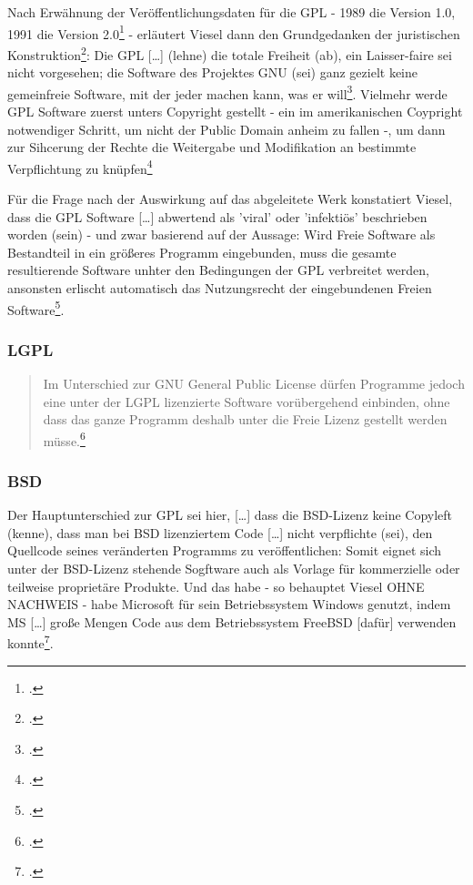 \documentclass[DIV=calc,BCOR=5mm,11pt,headings=small,oneside,abstract=true, toc=bib]{scrartcl}
\begin{document}
Nach Erwähnung der Veröffentlichungsdaten für die GPL - 1989 die Version
1.0, 1991 die Version 2.0\footcite[vgl.][61]{Viesel2006a} - erläutert Viesel
dann den Grundgedanken der juristischen
Konstruktion\footcite[vgl.][62ff]{Viesel2006a}: Die GPL \glqq{}[\ldots]
(lehne) die totale Freiheit (ab)\grqq{}, ein \glqq{}Laisser-faire\grqq{} sei
nicht vorgesehen; \glqq{}die Software des Projektes GNU (sei) ganz
gezielt keine gemeinfreie Software, mit der jeder machen kann, was er
will\grqq{}\footcite[vgl.][63]{Viesel2006a}. Vielmehr werde GPL Software zuerst
unters Copyright gestellt - ein im amerikanischen Coypright notwendiger Schritt,
um nicht der Public Domain anheim zu fallen -, um dann zur Sihcerung der Rechte
die Weitergabe und Modifikation an bestimmte Verpflichtung zu
knüpfen\footcite[vgl.][62f]{Viesel2006a}

Für die Frage nach der Auswirkung auf das abgeleitete Werk konstatiert Viesel,
dass die GPL Software \glqq{}[\ldots] abwertend als 'viral' oder
'infektiös' beschrieben worden (sein)\grqq{} - und zwar basierend auf der
Aussage: \glqq{}Wird Freie Software als Bestandteil in ein größeres
Programm eingebunden, muss die gesamte resultierende Software unhter den
Bedingungen der GPL verbreitet werden, ansonsten erlischt automatisch das
Nutzungsrecht der eingebundenen Freien
Software\grqq{}\footcite[vgl.][63]{Viesel2006a}.

\subsubsection{LGPL}
\begin{quote}\glqq{}Im Unterschied zur GNU General Public License dürfen
Programme jedoch eine unter der LGPL lizenzierte Software vorübergehend
einbinden, ohne dass das ganze Programm deshalb unter die Freie Lizenz
gestellt werden müsse.\grqq{}\footcite[vgl.][66]{Viesel2006a}
\end{quote}

\subsubsection{BSD}

Der Hauptunterschied zur GPL sei hier, \glqq{}[\ldots] dass die
BSD-Lizenz keine Copyleft (kenne)\grqq{}, dass man bei BSD lizenziertem Code
\glqq{}[\ldots] nicht verpflichte (sei), den Quellcode seines veränderten
Programms zu veröffentlichen\grqq{}: \glqq{}Somit eignet sich unter der
BSD-Lizenz stehende Sogftware auch als Vorlage für kommerzielle oder
teilweise proprietäre Produkte\grqq{}. Und das habe - so behauptet Viesel OHNE
NACHWEIS - habe Microsoft für sein Betriebssystem Windows genutzt, indem MS
\glqq{}[\ldots] große Mengen Code aus dem Betriebssystem FreeBSD [dafür]
verwenden konnte\grqq{}\footcite[vgl.][67]{Viesel2006a}.
\end{document}
